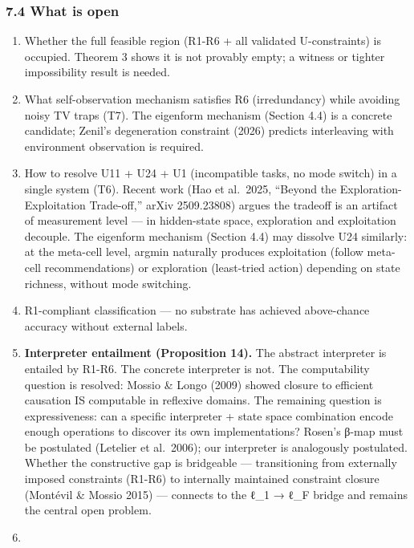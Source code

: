 \documentclass[
  11pt,
]{article}
\providecommand{\tightlist}{%
  \setlength{\itemsep}{0pt}\setlength{\parskip}{0pt}}
\begin{document}
\subsubsection{7.4 What is open}\label{what-is-open}

\begin{enumerate}
\def\labelenumi{\arabic{enumi}.}
\setcounter{enumi}{14}
\tightlist
\item
  Whether the full feasible region (R1-R6 + all validated U-constraints)
  is occupied. Theorem 3 shows it is not provably empty; a witness or
  tighter impossibility result is needed.
\item
  What self-observation mechanism satisfies R6 (irredundancy) while
  avoiding noisy TV traps (T7). The eigenform mechanism (Section 4.4) is
  a concrete candidate; Zenil's degeneration constraint (2026) predicts
  interleaving with environment observation is required.
\item
  How to resolve U11 + U24 + U1 (incompatible tasks, no mode switch) in
  a single system (T6). Recent work (Hao et al.~2025, ``Beyond the
  Exploration-Exploitation Trade-off,'' arXiv 2509.23808) argues the
  tradeoff is an artifact of measurement level --- in hidden-state
  space, exploration and exploitation decouple. The eigenform mechanism
  (Section 4.4) may dissolve U24 similarly: at the meta-cell level,
  argmin naturally produces exploitation (follow meta-cell
  recommendations) or exploration (least-tried action) depending on
  state richness, without mode switching.
\item
  R1-compliant classification --- no substrate has achieved above-chance
  accuracy without external labels.
\item
  \textbf{Interpreter entailment (Proposition 14).} The abstract
  interpreter is entailed by R1-R6. The concrete interpreter is not. The
  computability question is resolved: Mossio \& Longo (2009) showed
  closure to efficient causation IS computable in reflexive domains. The
  remaining question is expressiveness: can a specific interpreter +
  state space combination encode enough operations to discover its own
  implementations? Rosen's β-map must be postulated (Letelier et
  al.~2006); our interpreter is analogously postulated. Whether the
  constructive gap is bridgeable --- transitioning from externally
  imposed constraints (R1-R6) to internally maintained constraint
  closure (Montévil \& Mossio 2015) --- connects to the ℓ\_1 → ℓ\_F
  bridge and remains the central open problem.
\item

\end{enumerate}
\end{document}
